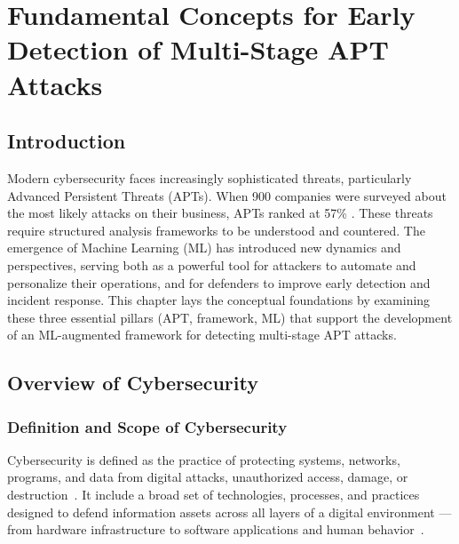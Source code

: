 ﻿\chapter{Fundamental Concepts for Early Detection of Multi-Stage APT Attacks}

\section{Introduction}
Modern cybersecurity faces increasingly sophisticated threats, particularly Advanced Persistent Threats (APTs). When 900 companies were surveyed about the most likely attacks on their business, APTs ranked at 57\% \cite{aag2024stats}. These threats require structured analysis frameworks to be understood and countered. The emergence of Machine Learning (ML) has introduced new dynamics and perspectives, serving both as a powerful tool for attackers to automate and personalize their operations, and for defenders to improve early detection and incident response. This chapter lays the conceptual foundations by examining these three essential pillars (APT, framework, ML) that support the development of an ML-augmented framework for detecting multi-stage APT attacks.

\section{Overview of Cybersecurity}

\subsection{Definition and Scope of Cybersecurity}
Cybersecurity is defined as the practice of protecting systems, networks, programs, and data from digital attacks, unauthorized access, damage, or destruction~\cite{cains2022cybersecurity,nist2023cyber}. It include a broad set of technologies, processes, and practices designed to defend information assets across all layers of a digital environment --- from hardware infrastructure to software applications and human behavior~\cite{cisco2024cyber}.

